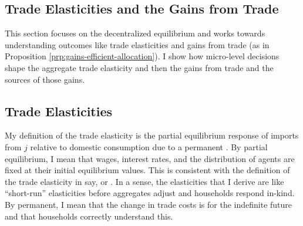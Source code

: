 \documentclass[12pt,pdftex]{article}
\begin{document}
\begin{onehalfspacing}

\section{Trade Elasticities and the Gains from Trade}

This section focuses on the decentralized equilibrium and works towards understanding outcomes like trade elasticities and gains from trade (as in Proposition \ref{prp:gains-efficient-allocation}). I show how micro-level decisions shape the aggregate trade elasticity and then the gains from trade and the sources of those gains.

\subsection{Trade Elasticities}

My definition of the trade elasticity is the partial equilibrium response of imports from $j$ relative to domestic consumption due to a permanent . By partial equilibrium, I mean that wages, interest rates, and the distribution of agents are fixed at their initial equilibrium values. This is consistent with the definition of the trade elasticity in say, \citet{arkolakis2012new} or \citet{simonovska2014elasticity}. In a sense, the elasticities that I derive are like ``short-run'' elasticities before aggregates adjust and households respond in-kind. By permanent, I mean that the change in trade costs is for the indefinite future and that households correctly understand this.


\end{onehalfspacing}
\end{document}
